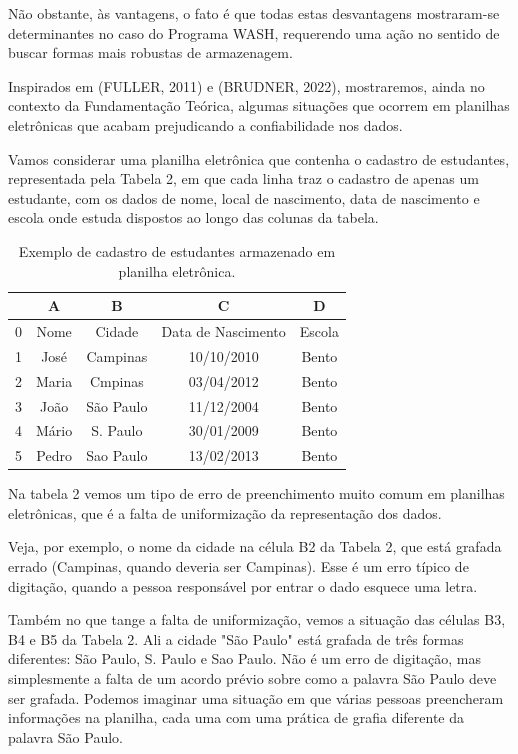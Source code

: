 Não obstante, às vantagens, o fato é que todas estas desvantagens mostraram-se determinantes no caso do Programa WASH, requerendo uma ação no sentido de buscar formas mais robustas de armazenagem.

Inspirados em (FULLER, 2011) e (BRUDNER, 2022), mostraremos, ainda no contexto da Fundamentação Teórica, algumas situações que ocorrem em planilhas eletrônicas que acabam prejudicando a confiabilidade nos dados.

Vamos considerar uma planilha  eletrônica que contenha o cadastro de estudantes, representada pela Tabela 2, em que cada linha traz o cadastro de apenas um estudante, com os dados de nome, local de nascimento, data de nascimento e escola onde estuda dispostos ao longo das colunas da tabela.





\begin{table}[htb]
\tiny
\caption{\label{758a32773d4ba814d5f99f08d8bfeb87ec1bf491}Exemplo de cadastro de estudantes armazenado em planilha eletrônica.}

\centering
\begin{tabular}{|c|c|c|c|c|}
\hline
  &  A  &  B  &  C  &  D  \\
\hline
0 & Nome  &  Cidade  &  Data de Nascimento  &  Escola \\
1 & José  &  Campinas  &  10/10/2010  &  Bento \\
2 & Maria  &  Cmpinas  &  03/04/2012  &  Bento \\
3 & João  &  São Paulo  &  11/12/2004  &  Bento \\
4 & Mário  &  S. Paulo  &  30/01/2009  &  Bento \\
5 & Pedro  &  Sao Paulo  &  13/02/2013  &  Bento \\
\hline
\end{tabular}
\end{table}


Na tabela 2 vemos um tipo de erro de preenchimento muito comum em planilhas eletrônicas, que é a falta de uniformização da representação dos dados.

Veja, por exemplo, o nome da cidade na célula B2 da Tabela 2, que está grafada errado (Campinas, quando deveria ser Campinas). Esse é um erro típico de digitação, quando a pessoa responsável por entrar o dado esquece uma letra.

Também no que tange a falta de uniformização, vemos a situação das células B3, B4 e B5 da Tabela 2. Ali a cidade "São Paulo" está grafada de três formas diferentes: São Paulo, S. Paulo e Sao Paulo. Não é um erro de digitação, mas simplesmente a falta de um acordo prévio sobre como a palavra São Paulo deve ser grafada. Podemos imaginar uma situação em que várias pessoas preencheram informações na planilha, cada uma com uma prática de grafia diferente da palavra São Paulo.

